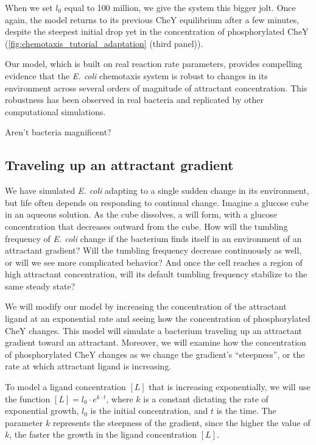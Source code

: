 When we set $l_0$ equal to 100 million, we give the system this bigger jolt. Once again, the model returns to its previous CheY equilibrium after a few minutes, despite the steepest initial drop yet in the concentration of phosphorylated CheY (\autoref{fig:chemotaxis_tutorial_adaptation} (third panel)).

Our model, which is built on real reaction rate parameters, provides compelling evidence that the \textit{E. coli} chemotaxis system is robust to changes in its environment across several orders of magnitude of attractant concentration. This robustness has been observed in real bacteria and replicated by other computational simulations.

Aren't bacteria magnificent?

\subsection{Traveling up an attractant gradient}

We have simulated \textit{E. coli} adapting to a single sudden change in its environment, but life often depends on responding to continual change. Imagine a glucose cube in an aqueous solution. As the cube dissolves, a  will form, with a glucose concentration that decreases outward from the cube. How will the tumbling frequency of \textit{E. coli} change if the bacterium finds itself in an environment of an attractant gradient?  Will the tumbling frequency decrease continuously as well, or will we see more complicated behavior? And once the cell reaches a region of high attractant concentration, will its default tumbling frequency stabilize to the same steady state?

We will modify our model by increasing the concentration of the attractant ligand at an exponential rate and seeing how the concentration of phosphorylated CheY changes. This model will simulate a bacterium traveling up an attractant gradient toward an attractant. Moreover, we will examine how the concentration of phosphorylated CheY changes as we change the gradient's ``steepness'', or the rate at which attractant ligand is increasing.


To model a ligand concentration $[L]$ that is increasing exponentially, we will use the function $[L] = l_0 \cdot e^{k \cdot t}$, where $k$ is a constant dictating the rate of exponential growth, $l_0$ is the initial concentration, and $t$ is the time. The parameter $k$ represents the steepness of the gradient, since the higher the value of $k$, the faster the growth in the ligand concentration $[L]$.

